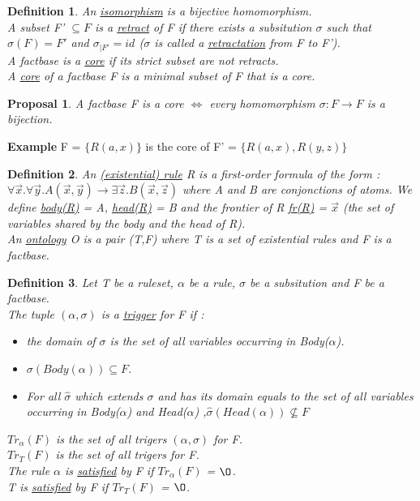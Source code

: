 \documentclass{article}
\newtheorem{pro}{Proposal}
\newtheorem{defi}{Definition}
\begin{document}
\begin{defi}
An \underline{isomorphism} is a bijective homomorphism. \\
A subset F' $\subseteq F$ is a \underline{retract} of F if there exists a subsitution $\sigma$ such that $\sigma(F) = F'$ and $\sigma_{|F'}=id$ ($\sigma$ is called a \underline{retractation} from F to F'). \\
A factbase is a \underline{core} if its strict subset are not retracts. \\
A \underline{core} of a factbase F is a minimal subset of F that is a core.
\end{defi}

\begin{pro}
A factbase F is a core $\Leftrightarrow$ every homomorphism $\sigma: F \to F$ is a bijection.
\end{pro}

\noindent \textbf{Example} F = $\{R(a,x)\}$ is the core of F' = $\{R(a,x),R(y,z)\}$

\begin{defi}
An \underline{(existential) rule} R is a first-order formula	 of the form : $\forall \vec x.\forall \vec y. A(\vec x,\vec y) \rightarrow \exists \vec z. B(\vec x,\vec z)$ where  A and B are conjonctions of atoms. We define \underline{body(R)} = A, \underline{head(R)} = B and the frontier of R \underline{fr(R)} = $\vec x$ (the set of variables shared by the body and the head of R). \\
An \underline{ontology} O is a pair (T,F) where T is a set of existential rules and F is a factbase.
\end{defi}

\begin{defi}
Let T be a ruleset, $\alpha$ be a rule, $\sigma$ be a subsitution and F be a factbase. \\
The tuple $(\alpha,\sigma)$ is a \underline{trigger} for F if : 
\begin{itemize}
\item the domain of $\sigma$ is the set of all variables occurring in Body($\alpha$).
\item $\sigma(Body(\alpha)) \subseteq F$.
\item For all $\hat \sigma$ which extends $\sigma$ and has its domain equals to the set of all variables occurring in Body($\alpha$) and Head($\alpha$) ,$\hat \sigma(Head(\alpha)) \nsubseteq F$
\end{itemize}
\underline{$Tr_{\alpha}(F)$} is the set of all trigers $(\alpha,\sigma)$ for F. \\
\underline{$Tr_{T}(F)$} is the set of all trigers for F. \\
The rule $\alpha$ is \underline{satisfied} by F if $Tr_{\alpha}(F)$ = $\O$. \\
T is \underline{satisfied} by F if $Tr_{T}(F)$ = $\O$.
\end{defi}
\end{document}
